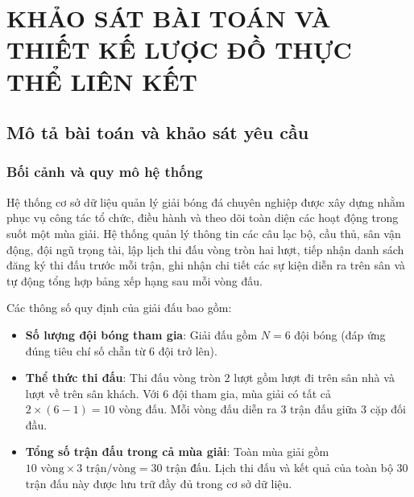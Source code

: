 \chapter{KHẢO SÁT BÀI TOÁN VÀ THIẾT KẾ LƯỢC ĐỒ THỰC THỂ LIÊN KẾT}

\section{Mô tả bài toán và khảo sát yêu cầu}

\subsection{Bối cảnh và quy mô hệ thống}
Hệ thống cơ sở dữ liệu quản lý giải bóng đá chuyên nghiệp được xây dựng nhằm phục vụ công tác tổ chức, điều hành và theo dõi toàn diện các hoạt động trong suốt một mùa giải. Hệ thống quản lý thông tin các câu lạc bộ, cầu thủ, sân vận động, đội ngũ trọng tài, lập lịch thi đấu vòng tròn hai lượt, tiếp nhận danh sách đăng ký thi đấu trước mỗi trận, ghi nhận chi tiết các sự kiện diễn ra trên sân và tự động tổng hợp bảng xếp hạng sau mỗi vòng đấu.

Các thông số quy định của giải đấu bao gồm:
\begin{itemize}
    \item \textbf{Số lượng đội bóng tham gia}: Giải đấu gồm $N = 6$ đội bóng (đáp ứng đúng tiêu chí số chẵn từ 6 đội trở lên).
    \item \textbf{Thể thức thi đấu}: Thi đấu vòng tròn 2 lượt gồm lượt đi trên sân nhà và lượt về trên sân khách. Với 6 đội tham gia, mùa giải có tất cả $2 \times (6 - 1) = 10$ vòng đấu. Mỗi vòng đấu diễn ra 3 trận đấu giữa 3 cặp đối đầu.
    \item \textbf{Tổng số trận đấu trong cả mùa giải}: Toàn mùa giải gồm $10 \text{ vòng} \times 3 \text{ trận/vòng} = 30 \text{ trận đấu}$. Lịch thi đấu và kết quả của toàn bộ 30 trận đấu này được lưu trữ đầy đủ trong cơ sở dữ liệu.
\end{itemize}

